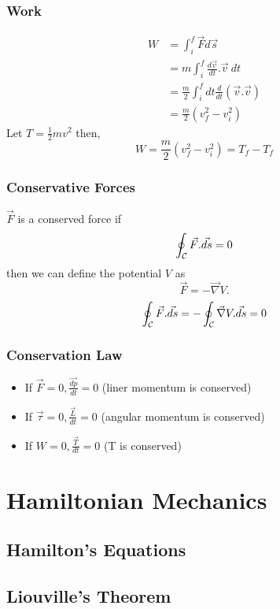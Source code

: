 \documentclass{book}
\begin{document}
\subsection{Work}
\[
  \begin{aligned}
    W & = \int ^{f} _{i} \vec{F} d \vec{s}                                         \\
      & = m \int ^{f} _{i} \frac{d \vec{v}}{d t} . \vec{v}~dt                      \\
      & = \frac{m}{2} \int ^{f} _{i} dt \frac{d}{dt} \left(\vec{v}. \vec{v}\right) \\
      & = \frac{m}{2}\left(v_f ^{2} - v_i ^{2} \right)
  \end{aligned}
\]
Let \(T=\frac{1}{2}mv ^{2} \) then,
\[
  W = \frac{m}{2} \left(v_f ^{2} - v_i ^{2} \right)= T_f - T_f
\]
\subsection*{Conservative Forces}
\(\vec{F}\) is a conserved force if
\[
  \oint _{ \cal{C} } \vec{F}. \vec{ds}= 0
\]
then we can define the potential \(V\) as
\[\vec{F}= - \vec{ \nabla }V.\]
\[
  \oint _{\cal C} \vec{F}. \vec{ds} = - \oint _{ \cal C} \vec{\nabla }V. \vec{ds}=0
\]
\subsection*{Conservation Law}
\begin{itemize}
  \item If \(\vec{F}=0, \frac{\vec{dp}}{dt}=0 \) (liner momentum is conserved)

  \item If \(\vec{\tau}=0, \frac{\vec{L}}{dt}=0 \) (angular momentum is conserved)

  \item If \(W=0, \frac{\vec{T}}{dt}=0 \) (T is conserved)


\end{itemize}


\chapter{Hamiltonian Mechanics}
\section{Hamilton's Equations}
\section{Liouville's Theorem}


\printindex
\end{document}
